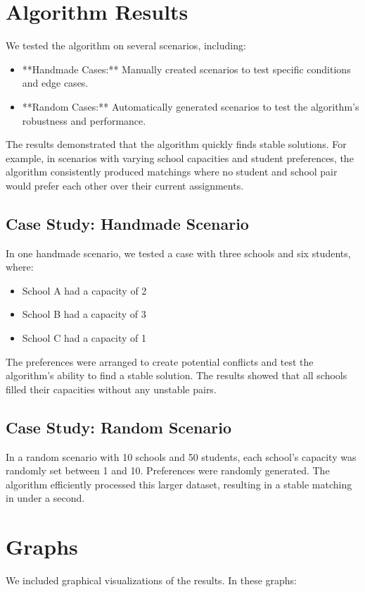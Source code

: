 \documentclass{article}
\begin{document}
\section{Algorithm Results}
We tested the algorithm on several scenarios, including:

\begin{itemize}
    \item **Handmade Cases:** Manually created scenarios to test specific conditions and edge cases.
    \item **Random Cases:** Automatically generated scenarios to test the algorithm's robustness and performance.
\end{itemize}

The results demonstrated that the algorithm quickly finds stable solutions. For example, in scenarios with varying school capacities and student preferences, the algorithm consistently produced matchings where no student and school pair would prefer each other over their current assignments.

\subsection{Case Study: Handmade Scenario}
In one handmade scenario, we tested a case with three schools and six students, where:

\begin{itemize}
    \item School A had a capacity of 2
    \item School B had a capacity of 3
    \item School C had a capacity of 1
\end{itemize}

The preferences were arranged to create potential conflicts and test the algorithm's ability to find a stable solution. The results showed that all schools filled their capacities without any unstable pairs.

\subsection{Case Study: Random Scenario}
In a random scenario with 10 schools and 50 students, each school's capacity was randomly set between 1 and 10. Preferences were randomly generated. The algorithm efficiently processed this larger dataset, resulting in a stable matching in under a second.

\section{Graphs}
We included graphical visualizations of the results. In these graphs:
\end{document}
